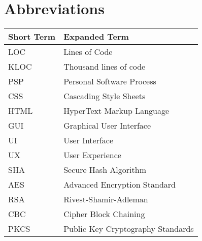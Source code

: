 \chapter{Abbreviations}




\begin{tabular}{p{40mm}|p{100mm}}
	\textbf{Short Term}&\textbf{Expanded Term}\\
	\hline
	LOC		&	Lines of Code\\
	KLOC	&	Thousand lines of code\\
	PSP		& 	Personal Software Process\\
	CSS 		& Cascading Style Sheets\\
	HTML 	& HyperText Markup Language\\
	GUI		& Graphical User Interface\\
	UI			& User Interface\\
	UX 		& User Experience\\
	SHA 		& Secure Hash Algorithm\\
	AES		& Advanced Encryption Standard\\
	RSA		& Rivest-Shamir-Adleman\\
	CBC 		& Cipher Block Chaining\\
	PKCS 	& Public Key Cryptography Standards\\
\end{tabular}